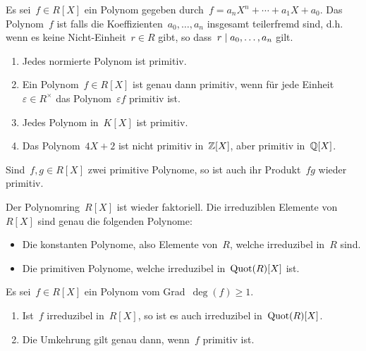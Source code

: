 \begin{definition}
  Es sei~$f \in R[X]$ ein Polynom gegeben durch~$f = a_n X^n + \dotsb + a_1 X + a_0$.
  Das Polynom~$f$ ist  falls die Koeffizienten~$a_0, \dotsc, a_n$ insgesamt teilerfremd sind, d.h. wenn es keine Nicht-Einheit~$r \in R$ gibt, so dass~$r \mid a_0, \dotsc, a_n$ gilt.
\end{definition}

\begin{example}
  \leavevmode
  \begin{enumerate}
    \item
      Jedes normierte Polynom ist primitiv.
    \item
      Ein Polynom~$f \in R[X]$ ist genau dann primitiv, wenn für jede Einheit~$\varepsilon \in R^\times$ das Polynom~$\varepsilon f$ primitiv ist.
    \item
      Jedes Polynom in~$K[X]$ ist primitiv.
    \item
      Das Polynom~$4X + 2$ ist nicht primitiv in~$\mathbb{Z}[X]$, aber primitiv in~$\mathbb{Q}[X]$.
  \end{enumerate}
\end{example}

\begin{proposition}
  Sind~$f, g \in R[X]$ zwei primitive Polynome, so ist auch ihr Produkt~$fg$ wieder primitiv.
\end{proposition}

\begin{theorem}
  Der Polynomring~$R[X]$ ist wieder faktoriell.
  Die irreduziblen Elemente von~$R[X]$ sind genau die folgenden Polynome:
  \begin{itemize}
    \item
      Die konstanten Polynome, also Elemente von~$R$, welche irreduzibel in~$R$ sind.
    \item
      Die primitiven Polynome, welche irreduzibel in~$\operatorname{Quot}(R)[X]$ ist.
  \end{itemize}
\end{theorem}

\begin{corollary}
  Es sei~$f \in R[X]$ ein Polynom vom Grad~$\deg(f) \geq 1$.
  \begin{enumerate}
    \item
      Ist~$f$ irreduzibel in~$R[X]$, so ist es auch irreduzibel in~$\operatorname{Quot}(R)[X]$.
    \item
      Die Umkehrung gilt genau dann, wenn~$f$ primitiv ist.
  \end{enumerate}
\end{corollary}


